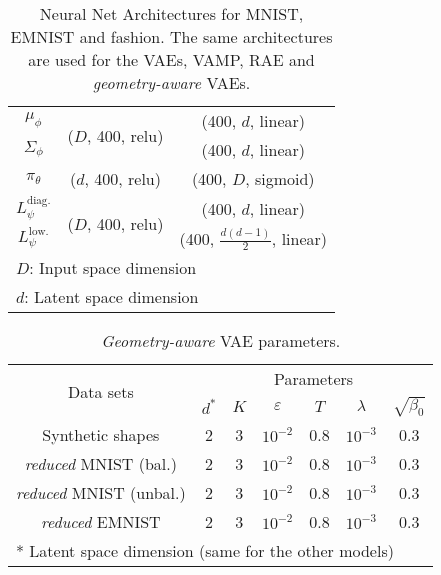 \documentclass[10pt,journal,compsoc]{IEEEtran}
\begin{document}
\begin{table}[ht]
\caption{Neural Net Architectures for MNIST, EMNIST and fashion. The same architectures are used for the VAEs, VAMP, RAE and \emph{geometry-aware} VAEs. }
    \centering
    \begin{tabular}{c|cc}
    \hline
         $\mu_{\phi} $      &  \multirow{2}{*}{($D$, 400, relu)}& (400, $d$, linear)   \\
         $\Sigma_{\phi}$    &                                 & (400, $d$, linear) \\
         \hline
         $ \pi_{\theta} $   &  ($d$, 400, relu)                 & (400, $D$, sigmoid)   \\
         \hline
        $L_{\psi}^{\text{diag.}}$  &  \multirow{2}{*}{($D$, 400, relu)}& (400, $d$, linear)   \\
        $L_{\psi}^{\text{low.}}$    &                                 & (400, $\frac{d(d-1)}{2}$, linear)\\
        \hline
        \multicolumn{3}{l}{\scriptsize{$D$: Input space dimension}}\\
        \multicolumn{3}{l}{\scriptsize{$d$: Latent space dimension}}
    \end{tabular}
    \label{tab: app mnist neural arch generation}
\end{table}



\begin{table}[!ht]
  \centering
  \caption{\emph{Geometry-aware} VAE parameters.}
  \label{Table: app Hyper-parameters}
  \begin{tabular}{c|cccccc}
  \hline
       \multirow{2}{*}{Data sets} & \multicolumn{6}{c}{Parameters} \\
       & $d^{*}$  & $K$ & $\varepsilon$ & $T$ & $\lambda$ & $\sqrt{\beta_0}$   \\
      \hline
      Synthetic shapes                  & 2 & 3 & $10^{-2}$ & 0.8 & $10^{-3}$ & 0.3 \\
      \textit{reduced} MNIST (bal.)           & 2 & 3 & $10^{-2}$ & 0.8 & $10^{-3}$ & 0.3 \\
      \textit{reduced} MNIST (unbal.)         & 2 & 3 & $10^{-2}$ & 0.8 & $10^{-3}$ & 0.3 \\
      \textit{reduced} EMNIST           & 2 & 3 & $10^{-2}$ & 0.8 & $10^{-3}$ & 0.3 \\
      \hline
      \multicolumn{7}{l}{\scriptsize{* Latent space dimension (same for the other models)}} 
  \end{tabular}
\end{table}
\end{document}
